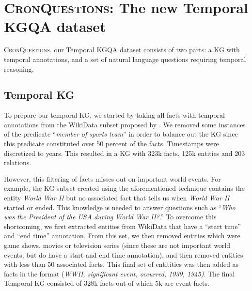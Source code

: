 \documentclass[11pt,a4paper]{article}
\newcommand{\dataset}{\textsc{CronQuestions}}
\begin{document}
\section{\dataset{}: The new Temporal KGQA dataset}

\dataset{}, our Temporal KGQA dataset consists of two parts: a KG with temporal annotations, and a set of natural language questions requiring temporal reasoning.

\subsection{Temporal KG}

To prepare our temporal KG, we started by taking all facts with temporal annotations from the WikiData subset proposed by \citet{lacroix2020tntcomplex}. We removed some instances of the predicate ``\textit{member of sports team}'' in order to balance out the KG since this predicate constituted over 50 percent of the facts. Timestamps were discretized to years. This resulted in a KG with 323k facts, 125k entities and 203 relations.


However, this filtering of facts misses out on important world events. For example, the KG subset created using the aforementioned technique contains the entity \textit{World War II} but no associated fact that tells us when \textit{World War II} started or ended. This knowledge is needed to answer questions such as ``\textit{Who was the President of the USA during World War II?}.''  To overcome this shortcoming, we first extracted entities from WikiData that have a ``start time'' and ``end time'' annotation. From this set, we then removed entities which were game shows, movies or television series (since these are not important world events, but do have a start and end time annotation), and then removed entities with less than 50 associated facts. This final set of entitities was then added as facts in the format (\textit{WWII, significant event, occurred, 1939, 1945)}. The final Temporal KG consisted of 328k facts out of which 5k are event-facts.
\end{document}
